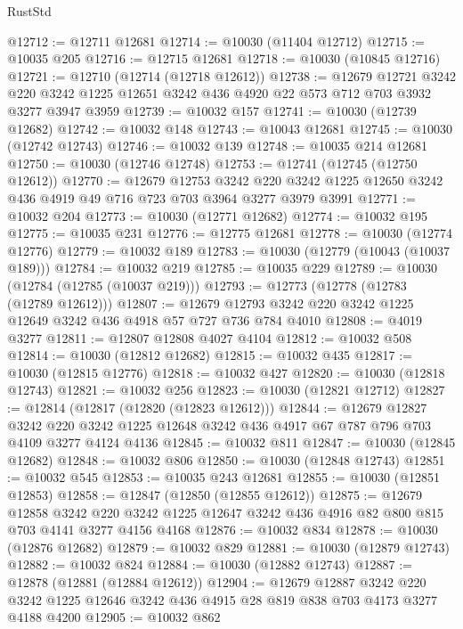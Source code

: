 \begin{lexlean}{RustStd}
\begin{coremodule}
@12712 := @12711 @12681
@12714 := @10030 (@11404 @12712)
@12715 := @10035 @205
@12716 := @12715 @12681
@12718 := @10030 (@10845 @12716)
@12721 := @12710 (@12714 (@12718 @12612))
@12738 := @12679
    @12721
    @3242
    @220
    @3242
    @1225
    @12651
    @3242
    @436
    @4920
    @22
    @573
    @712
    @703
    @3932
    @3277
    @3947
    @3959
@12739 := @10032 @157
@12741 := @10030 (@12739 @12682)
@12742 := @10032 @148
@12743 := @10043 @12681
@12745 := @10030 (@12742 @12743)
@12746 := @10032 @139
@12748 := @10035 @214 @12681
@12750 := @10030 (@12746 @12748)
@12753 := @12741 (@12745 (@12750 @12612))
@12770 := @12679
    @12753
    @3242
    @220
    @3242
    @1225
    @12650
    @3242
    @436
    @4919
    @49
    @716
    @723
    @703
    @3964
    @3277
    @3979
    @3991
@12771 := @10032 @204
@12773 := @10030 (@12771 @12682)
@12774 := @10032 @195
@12775 := @10035 @231
@12776 := @12775 @12681
@12778 := @10030 (@12774 @12776)
@12779 := @10032 @189
@12783 := @10030 (@12779 (@10043 (@10037 @189)))
@12784 := @10032 @219
@12785 := @10035 @229
@12789 := @10030 (@12784 (@12785 (@10037 @219)))
@12793 := @12773 (@12778 (@12783 (@12789 @12612)))
@12807 := @12679 @12793 @3242 @220 @3242 @1225 @12649 @3242 @436 @4918 @57 @727 @736 @784 @4010
@12808 := @4019 @3277
@12811 := @12807 @12808 @4027 @4104
@12812 := @10032 @508
@12814 := @10030 (@12812 @12682)
@12815 := @10032 @435
@12817 := @10030 (@12815 @12776)
@12818 := @10032 @427
@12820 := @10030 (@12818 @12743)
@12821 := @10032 @256
@12823 := @10030 (@12821 @12712)
@12827 := @12814 (@12817 (@12820 (@12823 @12612)))
@12844 := @12679
    @12827
    @3242
    @220
    @3242
    @1225
    @12648
    @3242
    @436
    @4917
    @67
    @787
    @796
    @703
    @4109
    @3277
    @4124
    @4136
@12845 := @10032 @811
@12847 := @10030 (@12845 @12682)
@12848 := @10032 @806
@12850 := @10030 (@12848 @12743)
@12851 := @10032 @545
@12853 := @10035 @243 @12681
@12855 := @10030 (@12851 @12853)
@12858 := @12847 (@12850 (@12855 @12612))
@12875 := @12679
    @12858
    @3242
    @220
    @3242
    @1225
    @12647
    @3242
    @436
    @4916
    @82
    @800
    @815
    @703
    @4141
    @3277
    @4156
    @4168
@12876 := @10032 @834
@12878 := @10030 (@12876 @12682)
@12879 := @10032 @829
@12881 := @10030 (@12879 @12743)
@12882 := @10032 @824
@12884 := @10030 (@12882 @12743)
@12887 := @12878 (@12881 (@12884 @12612))
@12904 := @12679
    @12887
    @3242
    @220
    @3242
    @1225
    @12646
    @3242
    @436
    @4915
    @28
    @819
    @838
    @703
    @4173
    @3277
    @4188
    @4200
@12905 := @10032 @862

\end{coremodule}
\end{lexlean}
